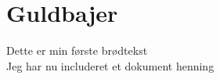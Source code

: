\chapter{Guldbajer}
Dette er min første brødtekst \\
\phantom{mmmm}Jeg har nu includeret et dokument
henning